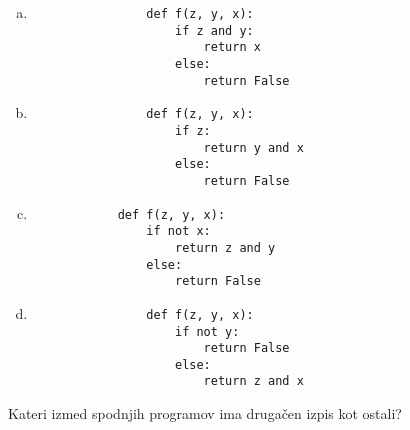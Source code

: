 \documentclass[arhiv, 10pt]{../izpit}
\begin{document}
        \begin{multicols}{2}
        \begin{enumerate}[(a)]
\item 
                \begin{verbatim}
                def f(z, y, x):
                    if z and y:
                        return x
                    else:
                        return False
                \end{verbatim}
            
\item 
                \begin{verbatim}
                def f(z, y, x):
                    if z:
                        return y and x
                    else:
                        return False
                \end{verbatim}
            
\item 
            \begin{verbatim}
            def f(z, y, x):
                if not x:
                    return z and y
                else:
                    return False
            \end{verbatim}
        
\item 
                \begin{verbatim}
                def f(z, y, x):
                    if not y:
                        return False
                    else:
                        return z and x
                \end{verbatim}
            
\end{enumerate}

        \end{multicols}
    
        \naloga*
        
        Kateri izmed spodnjih programov ima drugačen izpis kot ostali?
    
\end{document}
